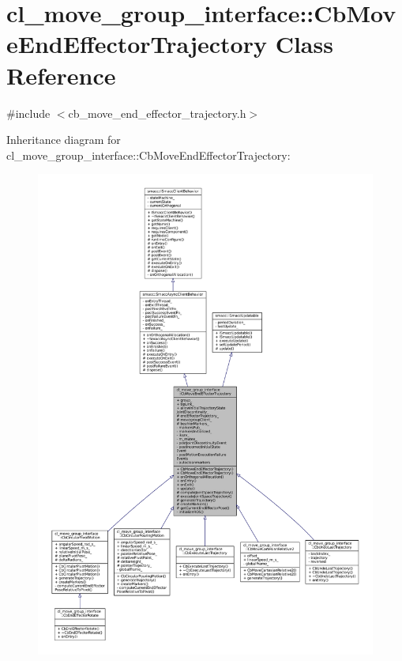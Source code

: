 \hypertarget{classcl__move__group__interface_1_1CbMoveEndEffectorTrajectory}{}\section{cl\+\_\+move\+\_\+group\+\_\+interface\+:\+:Cb\+Move\+End\+Effector\+Trajectory Class Reference}
\label{classcl__move__group__interface_1_1CbMoveEndEffectorTrajectory}


{\ttfamily \#include $<$cb\+\_\+move\+\_\+end\+\_\+effector\+\_\+trajectory.\+h$>$}



Inheritance diagram for cl\+\_\+move\+\_\+group\+\_\+interface\+:\+:Cb\+Move\+End\+Effector\+Trajectory\+:
\nopagebreak
\begin{figure}[H]
\begin{center}
\leavevmode
\includegraphics[width=350pt]{classcl__move__group__interface_1_1CbMoveEndEffectorTrajectory__inherit__graph}
\end{center}
\end{figure}


